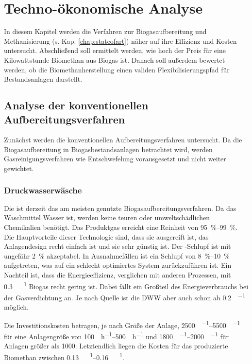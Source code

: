 
\section{Techno-ökonomische Analyse}\label{chap:chap_tececon}

In diesem Kapitel werden die Verfahren zur Biogasaufbereitung und Methanisierung (s. Kap. \ref{chap:stateofart}) näher auf ihre Effizienz und Kosten untersucht. Abschließend soll ermittelt werden, wie hoch der Preis für eine Kilowattstunde Biomethan aus Biogas ist. Danach soll außerdem bewertet werden, ob die Biomethanherstellung einen validen Flexibilisierungspfad für Bestandsanlagen darstellt. 

\subsection{Analyse der konventionellen Aufbereitungsverfahren}
Zunächst werden die konventionellen Aufbereitungsverfahren untersucht. Da die Biogasaufbereitung in Biogasbestandsanlagen betrachtet wird, werden Gasreinigungsverfahren wie Entschwefelung vorausgesetzt und nicht weiter gewichtet.  \smallskip


\subsubsection{Druckwasserwäsche}
Die  ist derzeit das am meisten genutzte Biogasaufbereitungsverfahren. Da das Waschmittel Wasser ist, werden keine teuren oder umweltschädlichen Chemikalien benötigt. Das Produktgas erreicht eine  Reinheit von \SIrange{95}{99}{\percent}. Die Hauptvorteile dieser Technologie sind, dass sie ausgereift ist, das Anlagendesign recht einfach ist und sie sehr günstig ist. Der -Schlupf ist mit ungefähr \SI{2}{\percent} akzeptabel. In Ausnahmefällen ist ein Schlupf von \SIrange{8}{10}{\percent} aufgetreten, was auf ein schlecht optimiertes System zurückzuführen ist. Ein Nachteil ist, dass die Energieeffizienz, verglichen mit anderen Prozessen, mit \SI{0,3}{\kwh\per\normvol} Biogas recht gering ist. Dabei fällt ein Großteil des Energieverbrauchs bei der Gasverdichtung an. Je nach Quelle ist die \gls{DWW} aber auch schon ab \SI{0,2}{\kwh\per\normvol} möglich. \parencite{Emp18} \parencite{Coll17}\smallskip

Die Investitionskosten betragen, je nach Größe der Anlage, \SIrange{2500}{5500}{\sieuro\per\normvolh} für eine Anlagengröße von \SIrange{100}{500}{\normvol\per\hour} und \SIrange{1800}{2000}{\sieuro\per\normvolh} für Anlagen größer als \SI{1000}{\normvolh}. Letztendlich liegen die Kosten für das produzierte Biomethan zwischen \SIrange{0,13}{0,16}{\sieuro\per\normvol}. \parencite{Emp18} \parencite{KGKK2019} \parencite{Struk20}\smallskip

